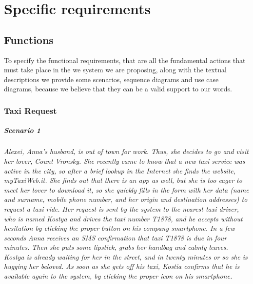 \chapter{Specific requirements}


\section{Functions}
To specify the functional requirements, that are all the fundamental actions that must take place in the we system we are proposing, along with the textual descriptions we provide some scenarios, sequence diagrams and use case diagrams, because we believe that they can be a valid support to our words.


\subsection{Taxi Request}\label{subsec:taxiRequest}


\paragraph{Scenario 1}{\small\itshape Alexei, Anna's husband, is out of town for work. Thus, she decides to go and visit her lover, Count Vronsky. She recently came to know that a new taxi service was active in the city, so after a brief lookup in the Internet she finds the website, myTaxiWeb.it. She finds out that there is an app as well, but she is too eager to meet her lover to download it, so she quickly fills in the form with her data (name and surname, mobile phone number, and her origin and destination addresses) to request a taxi ride. Her request is sent by the system to the nearest taxi driver, who is named Kostya and drives the taxi number T1878, and he accepts without hesitation by clicking the proper button on his company smartphone. In a few seconds Anna receives an SMS confirmation that taxi T1878 is due in four minutes. Then she puts some lipstick, grabs her handbag and calmly leaves. Kostya is already waiting for her in the street, and in twenty minutes or so she is hugging her beloved. As soon as she gets off his taxi, Kostia confirms that he is available again to the system, by clicking the proper icon on his smartphone.}


